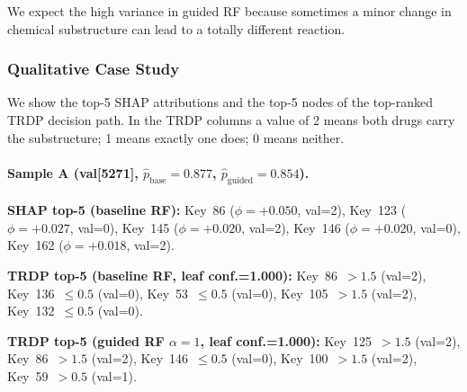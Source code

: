 \documentclass[letterpaper]{article} %
\begin{document}
\begin{table}[h]
\centering
\caption{Comparative analysis for Sample~A (val[5271]). Prediction consistency ($\bar{C}$) and path-feature Jaccard ($\bar{S}_J$) for baseline vs.\ SHAP-guided RF. For $k\leq10$ no neighbours exist.}
\label{tab:comparative_a}
\end{table}

We expect the high variance in guided RF because sometimes a minor change in chemical substructure can lead to a totally different reaction.
\subsubsection{Qualitative Case Study}

We show the top-5 SHAP attributions and the top-5 nodes of the top-ranked TRDP decision path.  In the TRDP columns a value of 2 means both drugs carry the substructure; 1 means exactly one does; 0 means neither.

\paragraph{Sample A (val[5271], $\hat{p}_{\text{base}}=0.877$, $\hat{p}_{\text{guided}}=0.854$).}

\noindent\textbf{SHAP top-5 (baseline RF):} Key~86 ($\phi{=}{+}0.050$, val=2), Key~123 ($\phi{=}{+}0.027$, val=0), Key~145 ($\phi{=}{+}0.020$, val=2), Key~146 ($\phi{=}{+}0.020$, val=0), Key~162 ($\phi{=}{+}0.018$, val=2).

\noindent\textbf{TRDP top-5 (baseline RF, leaf conf.=1.000):} Key~86~$>1.5$ (val=2), Key~136~$\leq0.5$ (val=0), Key~53~$\leq0.5$ (val=0), Key~105~$>1.5$ (val=2), Key~132~$\leq0.5$ (val=0).

\noindent\textbf{TRDP top-5 (guided RF $\alpha{=}1$, leaf conf.=1.000):} Key~125~$>1.5$ (val=2), Key~86~$>1.5$ (val=2), Key~146~$\leq0.5$ (val=0), Key~100~$>1.5$ (val=2), Key~59~$>0.5$ (val=1).
\end{document}
